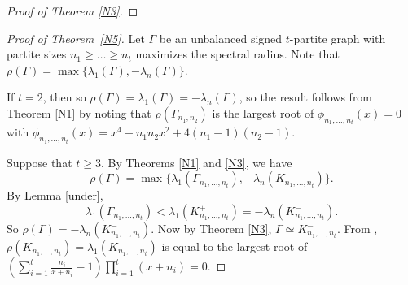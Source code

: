\documentclass[12pt]{article}
\numberwithin{equation}{section}
\newtheorem {Theorem} {Theorem}[section]
\begin{document}
\begin{proof} [Proof of Theorem \ref{N3}]
\end{proof}


\begin{proof}[Proof of Theorem~\ref{N5}] 
Let $\Gamma$ be an unbalanced signed $t$-partite graph with partite sizes $n_1\ge \dots\ge n_t$ maximizes the spectral radius. 
Note that $\rho(\Gamma)=\max\{\lambda_1(\Gamma), -\lambda_n(\Gamma)\}$. 

If $t=2$, then  %
so  $\rho(\Gamma)=\lambda_1(\Gamma)=-\lambda_n(\Gamma)$,  so the result follows from Theorem \ref{N1} by noting that $\rho(\Gamma_{n_1,n_2})$ is the largest root of $\phi_{n_1,\dots,n_t}(x)=0$ with $\phi_{n_1,\dots,n_t}(x)=x^4-n_1n_2x^2+4(n_1-1)(n_2-1)$.


Suppose  that $t\ge 3$. 
By Theorems \ref{N1} and \ref{N3}, we have 
\[
\rho(\Gamma)=\max\{\lambda_1(\Gamma_{n_1, \dots,  n_t}), -\lambda_n(K_{n_1, \dots, n_t}^-)\}.
\] 
By Lemma \ref{under},  
\[
\lambda_1(\Gamma_{n_1, \dots, n_t})<\lambda_1(K_{n_1, \dots, n_t}^+)=-\lambda_n(K_{n_1, \dots, n_t}^-). 
\]
So $\rho(\Gamma)=-\lambda_n(K_{n_1, \dots, n_t}^-)$. Now by Theorem \ref{N3}, $\Gamma\simeq K_{n_1, \dots, n_t}^-$. From \cite{De,EH}, 
$\rho(K_{n_1, \dots, n_t}^-)=\lambda_1(K_{n_1, \dots, n_t}^+)$ is equal to the largest root of $\left(\sum_{i=1}^t\frac{n_i}{x+n_i}-1\right)\prod_{i=1}^t(x+n_i)=0$.%
\end{proof}







\end{document}
